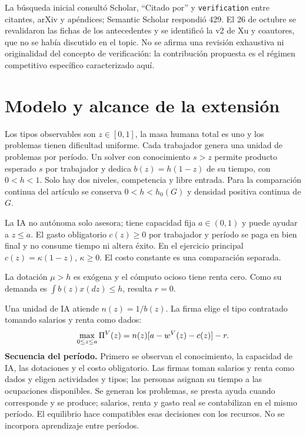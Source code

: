 \documentclass[11pt]{article}
\begin{document}
La búsqueda inicial consultó Scholar, ``Citado por'' y \texttt{verification} entre citantes, arXiv y apéndices; Semantic Scholar respondió 429. El 26 de octubre se revalidaron las fichas de los antecedentes y se identificó la v2 de Xu y coautores, que no se había discutido en el topic. No se afirma una revisión exhaustiva ni originalidad del concepto de verificación: la contribución propuesta es el régimen competitivo específico caracterizado aquí.
\newpage
\section{Modelo y alcance de la extensión}
\begin{assumption}\label{ass:tech}
Los tipos observables son $z\in[0,1]$, la masa humana total es uno y los problemas tienen dificultad uniforme. Cada trabajador genera una unidad de problemas por período. Un solver con conocimiento $s>z$ permite producto esperado $s$ por trabajador y dedica $b(z)=h(1-z)$ de su tiempo, con $0<h<1$. Solo hay dos niveles, competencia y libre entrada. Para la comparación continua del artículo se conserva $0<h<h_0(G)$ y densidad positiva continua de $G$.
\end{assumption}
\begin{assumption}\label{ass:ai}
La IA no autónoma solo asesora; tiene capacidad fija $a\in(0,1)$ y puede ayudar a $z\leq a$. El gasto obligatorio $c(z)\geq0$ por trabajador y período se paga en bien final y no consume tiempo ni altera éxito. En el ejercicio principal $c(z)=\kappa(1-z)$, $\kappa\geq0$. El costo constante es una comparación separada.
\end{assumption}
\begin{assumption}[Cómputo]\label{ass:compute}
La dotación $\mu>h$ es exógena y el cómputo ocioso tiene renta cero. Como su demanda es $\int b(z)x(dz)\leq h$, resulta $r=0$.
\end{assumption}
Una unidad de IA atiende $n(z)=1/b(z)$. La firma elige el tipo contratado tomando salarios y renta como dados:
\begin{equation}\label{eq:firm}
\max_{0\leq z\leq a}\Pi^V(z)=n(z)[a-w^V(z)-c(z)]-r.
\end{equation}
\textbf{Secuencia del período.} Primero se observan el conocimiento, la capacidad de IA, las dotaciones y el costo obligatorio. Las firmas toman salarios y renta como dados y eligen actividades y tipos; las personas asignan su tiempo a las ocupaciones disponibles. Se generan los problemas, se presta ayuda cuando corresponde y se produce; salarios, renta y gasto real se contabilizan en el mismo período. El equilibrio hace compatibles esas decisiones con los recursos. No se incorpora aprendizaje entre períodos.
\end{document}

